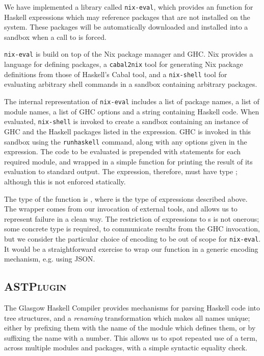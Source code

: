 \documentclass[]{article}
\begin{document}
We have implemented a library called \texttt{nix-eval}, which provides an  function for Haskell expressions which may reference packages that are not installed on the system. These packages will be automatically downloaded and installed into a sandbox when a call to  is forced.

\texttt{nix-eval} is build on top of the Nix package manager and GHC. Nix provides a language for defining packages, a \texttt{cabal2nix} tool for generating Nix package definitions from those of Haskell's Cabal tool, and a \texttt{nix-shell} tool for evaluating arbitrary shell commands in a sandbox containing arbitrary packages.

The internal representation of \texttt{nix-eval} includes a list of package names, a list of module names, a list of GHC options and a string containing Haskell code. When evaluated, \texttt{nix-shell} is invoked to create a sandbox containing an instance of GHC and the Haskell packages listed in the expression. GHC is invoked in this sandbox using the \texttt{runhaskell} command, along with any options given in the expression. The code to be evaluated is prepended with  statements for each required module, and wrapped in a simple  function for printing the result of its evaluation to standard output. The expression, therefore, must have type ; although this is not enforced statically.

The type of the  function is , where  is the type of expressions described above. The  wrapper comes from our invocation of external tools, and  allows us to represent failure in a clean way. The restriction of expressions to s is not onerous; some concrete type is required, to communicate results from the GHC invocation, but we consider the particular choice of encoding to be out of scope for \texttt{nix-eval}. It would be a straightforward exercise to wrap our  function in a generic encoding mechanism, e.g. using JSON.

\subsection{\textsc{ASTPlugin}}\label{astplugin}

The Glasgow Haskell Compiler provides mechanisms for parsing Haskell code into tree structures, and a \emph{renaming} transformation which makes all names unique; either by prefixing them with the name of the module which defines them, or by suffixing the name with a number. This allows us to spot repeated use of a term, across multiple modules and packages, with a simple syntactic equality check.
\end{document}
